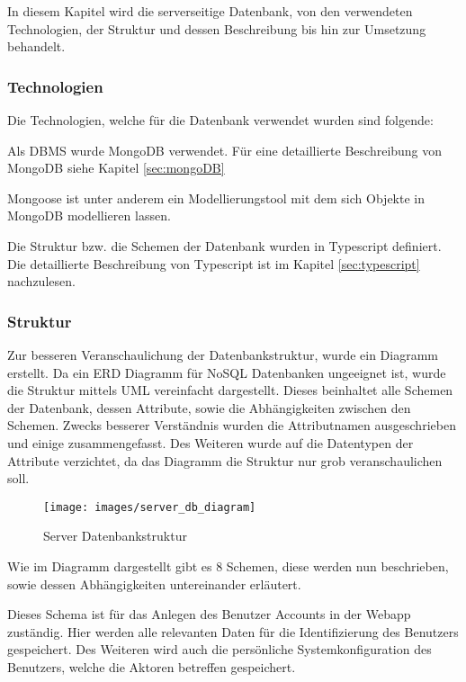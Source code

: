 In diesem Kapitel wird die serverseitige Datenbank, von den verwendeten Technologien, der Struktur und dessen Beschreibung bis hin zur Umsetzung behandelt.

\subsubsection{Technologien}

Die Technologien, welche für die Datenbank verwendet wurden sind folgende:

Als \gls{DBMS} wurde MongoDB verwendet. Für eine detaillierte Beschreibung von MongoDB siehe Kapitel \ref{sec:mongoDB}

Mongoose ist unter anderem ein Modellierungstool mit dem sich Objekte in MongoDB modellieren lassen.

Die Struktur bzw. die Schemen der Datenbank wurden in Typescript definiert. Die detaillierte Beschreibung von Typescript ist im Kapitel \ref{sec:typescript} nachzulesen.

\newpage

\subsubsection{Struktur}

Zur besseren Veranschaulichung der Datenbankstruktur, wurde ein Diagramm erstellt. Da ein \gls{ERD} Diagramm für \gls{NoSQL} Datenbanken ungeeignet ist, wurde die Struktur mittels \gls{UML} vereinfacht dargestellt. Dieses beinhaltet alle Schemen der Datenbank, dessen Attribute, sowie die Abhängigkeiten zwischen den Schemen. Zwecks besserer Verständnis wurden die Attributnamen ausgeschrieben und einige zusammengefasst. Des Weiteren wurde auf die Datentypen der Attribute verzichtet, da das Diagramm die Struktur nur grob veranschaulichen soll.

\begin{figure}[ht]
\begin{center}
	\texttt{[image: images/server\_db\_diagram]}
	\caption{Server Datenbankstruktur}
\end{center}
\end{figure}

\newpage

Wie im Diagramm dargestellt gibt es 8 Schemen, diese werden nun beschrieben, sowie dessen Abhängigkeiten untereinander erläutert.

Dieses Schema ist für das Anlegen des Benutzer Accounts in der Webapp zuständig. Hier werden alle relevanten Daten für die Identifizierung des Benutzers gespeichert. Des Weiteren wird auch die persönliche Systemkonfiguration des Benutzers, welche die Aktoren betreffen gespeichert.

